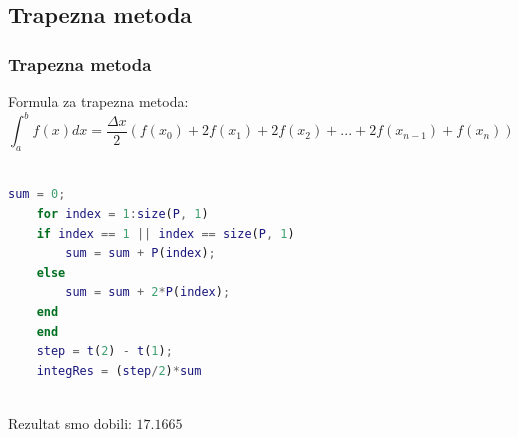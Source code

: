 \documentclass{beamer}
\begin{document}
\begin{frame}[fragile]
\section{Trapezna metoda}
\frametitle{Trapezna metoda}
    Formula za trapezna metoda: 
    \[\int_a^b f(x)dx = \frac{\Delta x}{2} (f(x_0)+2f(x_1)+2f(x_2)+...+2f(x_{n-1})+f(x_n))\]\
    \begin{lstlisting}[language=MatLab]
    sum = 0;
    for index = 1:size(P, 1)
    if index == 1 || index == size(P, 1)
        sum = sum + P(index);
    else
        sum = sum + 2*P(index);
    end
    end
    step = t(2) - t(1);
    integRes = (step/2)*sum
    
    \end{lstlisting}

    Rezultat smo dobili: $17.1665$
\end{frame}
\end{document}
